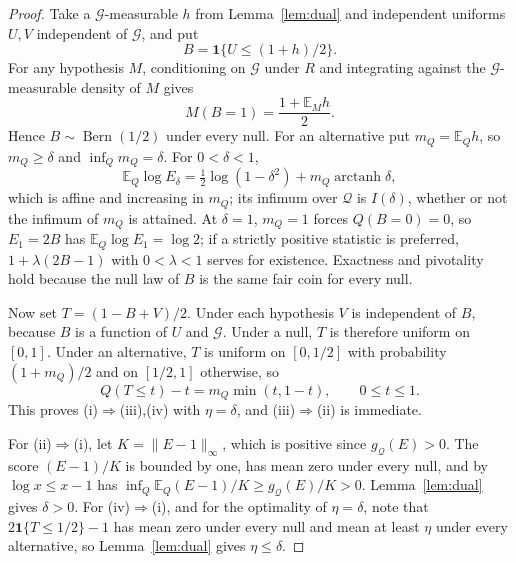 \documentclass[11pt,a4paper]{article}
\theoremstyle{definition}
\theoremstyle{remark}
\newcommand{\QQ}{\mathcal Q}
\newcommand{\EE}{\mathbb E}
\newcommand{\one}{\mathbf 1}
\newcommand{\Bern}{\operatorname{Bern}}
\DeclareMathOperator{\arctanh}{arctanh}
\begin{document}
\begin{proof}
Take a \(\mathcal G\)-measurable \(h\) from Lemma~\ref{lem:dual} and independent uniforms \(U,V\) independent of \(\mathcal G\), and put
\[
 B=\one\{U\le(1+h)/2\}.
\]
For any hypothesis \(M\), conditioning on \(\mathcal G\) under \(R\) and integrating against the \(\mathcal G\)-measurable density of \(M\) gives
\begin{equation}\label{eq:coin}
 M(B=1)=\frac{1+\EE_Mh}{2}.
\end{equation}
Hence \(B\sim\Bern(1/2)\) under every null. For an alternative put \(m_Q=\EE_Qh\), so \(m_Q\ge\delta\) and \(\inf_Qm_Q=\delta\). For \(0<\delta<1\),
\[
 \EE_Q\log E_\delta=\tfrac12\log(1-\delta^2)+m_Q\arctanh\delta ,
\]
which is affine and increasing in \(m_Q\); its infimum over \(\QQ\) is \(I(\delta)\), whether or not the infimum of \(m_Q\) is attained. At \(\delta=1\), \(m_Q=1\) forces \(Q(B=0)=0\), so \(E_1=2B\) has \(\EE_Q\log E_1=\log2\); if a strictly positive statistic is preferred, \(1+\lambda(2B-1)\) with \(0<\lambda<1\) serves for existence. Exactness and pivotality hold because the null law of \(B\) is the same fair coin for every null.

Now set \(T=(1-B+V)/2\). Under each hypothesis \(V\) is independent of \(B\), because \(B\) is a function of \(U\) and \(\mathcal G\). Under a null, \(T\) is therefore uniform on \([0,1]\). Under an alternative, \(T\) is uniform on \([0,1/2]\) with probability \((1+m_Q)/2\) and on \([1/2,1]\) otherwise, so
\[
 Q(T\le t)-t=m_Q\min(t,1-t),\qquad 0\le t\le1 .
\]
This proves (i)\(\Rightarrow\)(iii),(iv) with \(\eta=\delta\), and (iii)\(\Rightarrow\)(ii) is immediate.

For (ii)\(\Rightarrow\)(i), let \(K=\|E-1\|_\infty\), which is positive since \(g_{\QQ}(E)>0\). The score \((E-1)/K\) is bounded by one, has mean zero under every null, and by \(\log x\le x-1\) has \(\inf_Q\EE_Q(E-1)/K\ge g_{\QQ}(E)/K>0\). Lemma~\ref{lem:dual} gives \(\delta>0\). For (iv)\(\Rightarrow\)(i), and for the optimality of \(\eta=\delta\), note that \(2\one\{T\le1/2\}-1\) has mean zero under every null and mean at least \(\eta\) under every alternative, so Lemma~\ref{lem:dual} gives \(\eta\le\delta\).
\end{proof}
\end{document}
